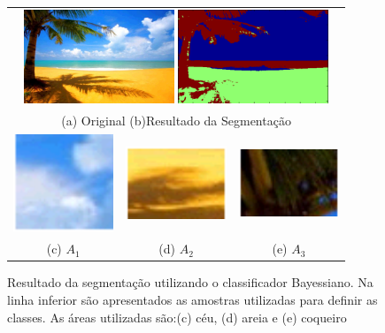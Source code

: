 \documentclass[ 
	article,			%
	11pt,				%
	oneside,			%
	a4paper,			%
	english,			%
	brazil,				%
	]{abntex2}
\begin{document}
\begin{figure}
	\centering
	\begin{tabular}{ccc}
	\multicolumn{3}{c}{
	  \includegraphics[width=45mm]{matlab/figura/gauss/segmentacao/paradise.jpg} 
	  \includegraphics[width=45mm]{matlab/figura/gauss/segmentacao/paradiseRes.png}
	  }\\ 
	\multicolumn{3}{c}{
	 \hspace{1cm} (a) Original \hspace{15mm} (b)Resultado da Segmentação
	  }\\ 	  
	 \includegraphics[width=30mm]{matlab/figura/gauss/segmentacao/pc1.png}&   
	 \includegraphics[width=30mm]{matlab/figura/gauss/segmentacao/pc2.png}& 
	 \includegraphics[width=30mm]{matlab/figura/gauss/segmentacao/pc3.png} \\
	(c) $A_1$ & (d) $A_2$ & (e) $A_3$\\[6pt] 

	\end{tabular}
	\caption{Resultado da segmentação utilizando o classificador Bayessiano. Na
	linha inferior são apresentados as amostras utilizadas para definir as
	classes. As áreas utilizadas são:(c) céu, (d) areia e (e) coqueiro}
	\label{fig:resultGaussSegParadise}
\end{figure}
\end{document}

